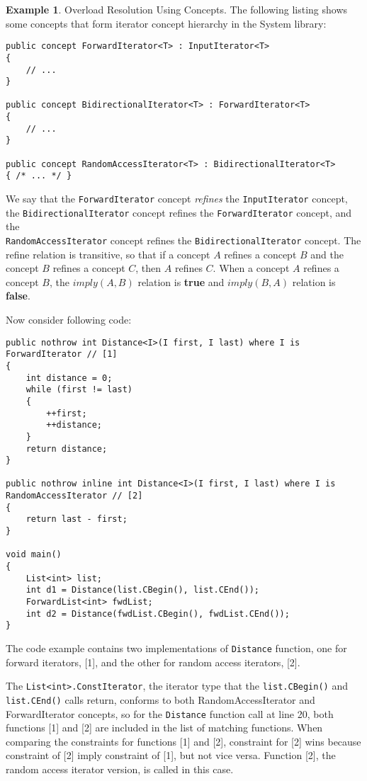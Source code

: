 \documentclass[a4paper,oneside,11pt]{book}
\theoremstyle{definition}
\newtheorem{exmp}{Example}[section]
\begin{document}
\begin{exmp} Overload Resolution Using Concepts.
The following listing shows some concepts that form iterator concept hierarchy in the System library:
\begin{flushleft}
\lstset{language=Cmajor}
\begin{lstlisting}[frame=trBL]
public concept ForwardIterator<T> : InputIterator<T>
{
    // ...
}

public concept BidirectionalIterator<T> : ForwardIterator<T>
{
    // ...
}

public concept RandomAccessIterator<T> : BidirectionalIterator<T>
{ /* ... */ }
\end{lstlisting}
\end{flushleft}

We say that the \verb|ForwardIterator| concept \emph{refines} the \verb|InputIterator| concept,\\
the \verb|BidirectionalIterator| concept refines the \verb|ForwardIterator| concept, and the\\
\verb|RandomAccessIterator| concept refines the \verb|BidirectionalIterator| concept.
The refine relation is transitive, so that if a concept $A$ refines a concept $B$ and
the concept $B$ refines a concept $C$, then $A$ refines $C$.
When a concept $A$ refines a concept $B$, the $imply(A, B)$ relation is \textbf{true} and
$imply(B, A)$ relation is \textbf{false}.

Now consider following code:
\begin{flushleft}
\lstset{language=Cmajor}
\begin{lstlisting}[frame=trBL]
public nothrow int Distance<I>(I first, I last) where I is ForwardIterator // [1]
{
    int distance = 0;
    while (first != last)
    {
        ++first;
        ++distance;
    }
    return distance;
}

public nothrow inline int Distance<I>(I first, I last) where I is RandomAccessIterator // [2]
{
    return last - first;
}

void main()
{
    List<int> list;
    int d1 = Distance(list.CBegin(), list.CEnd());
    ForwardList<int> fwdList;
    int d2 = Distance(fwdList.CBegin(), fwdList.CEnd());
}
\end{lstlisting}
\end{flushleft}
The code example contains two implementations of \verb|Distance| function, one for forward iterators, [1], and
the other for random access iterators, [2].

The \verb|List<int>.ConstIterator|, the iterator type that the \verb|list.CBegin()| and \verb|list.CEnd()| calls return,
conforms to both RandomAccessIterator and ForwardIterator concepts,
so for the \verb|Distance| function call at line 20, both functions [1] and [2] are included in the list of matching functions.
When comparing the constraints for functions [1] and [2], constraint for [2] wins because constraint of [2] imply constraint of [1], but not vice versa.
Function [2], the random access iterator version, is called in this case.


\end{exmp}
\end{document}
